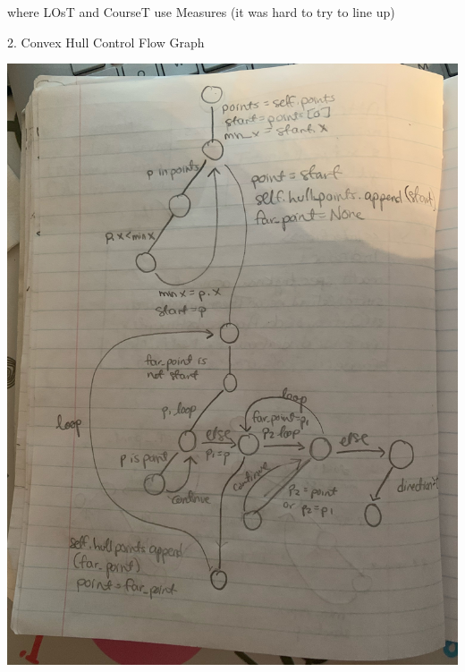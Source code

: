 \documentclass[12pt]{article}
\begin{document}
\noindent where LOsT and CourseT use Measures (it was hard to try to line up)

\item 2. Convex Hull Control Flow Graph

\begin{center}
	\includegraphics[scale=0.1]{Flow}
\end{center}
\end{document}
